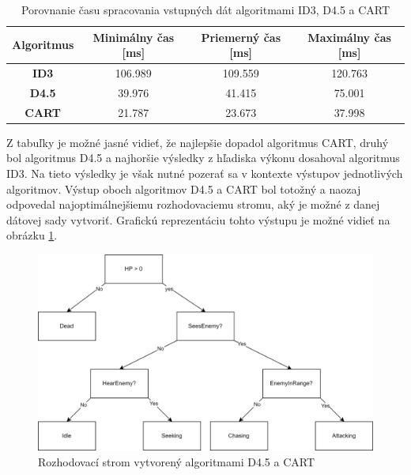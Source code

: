 \documentclass[slovak, master]{diploma}
\begin{document}
\begin{table}[!ht]
    \centering
    \begin{tabular}{|c|ccc|}
    \hline
        \textbf{Algoritmus} & \textbf{Minimálny čas [ms]} & \textbf{Priemerný čas [ms]} & \textbf{Maximálny čas [ms]} \\ \hline
        \textbf{ID3} & 106.989 & 109.559 & 120.763 \\ 
        \textbf{D4.5} & 39.976 & 41.415 & 75.001 \\ 
        \textbf{CART} & 21.787 & 23.673 & 37.998 \\ \hline
    \end{tabular}
    \caption{Porovnanie času spracovania vstupných dát algoritmami ID3, D4.5 a CART}
    \label{tab:benchmarks}
\end{table}

Z tabuľky je možné jasné vidieť, že najlepšie dopadol algoritmus CART, druhý bol algoritmus D4.5 a najhoršie výsledky z hľadiska výkonu dosahoval algoritmus ID3. Na tieto výsledky je však nutné pozerať sa v kontexte výstupov jednotlivých algoritmov. Výstup oboch algoritmov D4.5 a CART bol totožný a naozaj odpovedal najoptimálnejšiemu rozhodovaciemu stromu, aký je možné z danej dátovej sady vytvoriť. Grafickú reprezentáciu tohto výstupu je možné vidieť na obrázku \ref{pic:treeGraph}.

\begin{figure}[!htbp]
    \centering
    \includegraphics[width=1\textwidth]{Figures/Trees.png}
    \caption{Rozhodovací strom vytvorený algoritmami D4.5 a CART}
    \label{pic:treeGraph}
\end{figure}
\end{document}
